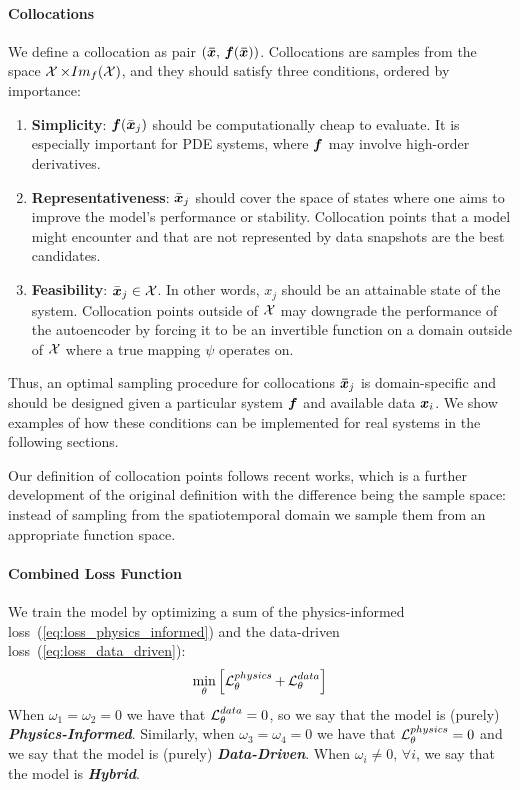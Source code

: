 \paragraph{Collocations}
\label{sec:collocations_conditions} We define a collocation as pair $(\boldsymbol{\bar{x}},\, \boldsymbol{f}(\boldsymbol{\bar{x}}))$. Collocations are samples from the space $\operatorname{\mathcal{X}} \times Im_{f}(\operatorname{\mathcal{X}})$, and they should satisfy three conditions, ordered by importance:
\begin{enumerate}
    \item \textbf{Simplicity}: $\boldsymbol{f}(\bar{\boldsymbol{x}}_j)$ should be computationally cheap to evaluate. It is especially important for PDE systems, where $\boldsymbol{f}$ may involve high-order derivatives.
    \item \textbf{Representativeness}: $\bar{\boldsymbol{x}}_j$ should cover the space of states where one aims to improve the model's performance or stability. Collocation points that a model might encounter and that are not represented by data snapshots are the best candidates.
    \item \textbf{Feasibility}: $\bar{\boldsymbol{x}}_j \in \operatorname{\mathcal{X}}$. In other words, $x_j$ should be an attainable state of the system. Collocation points outside of $\operatorname{\mathcal{X}}$ may downgrade the performance of the autoencoder by forcing it to be an invertible function on a domain outside of $\operatorname{\mathcal{X}}$ where a true mapping $\psi$ operates on.
\end{enumerate}
Thus, an optimal sampling procedure for collocations $\boldsymbol{\bar{x}}_j$ is domain-specific and should be designed given a particular system $\boldsymbol{f}$ and available data $\boldsymbol{x}_i$. We show examples of how these conditions can be implemented for real systems in the following sections.

Our definition of collocation points follows recent works\cite{liu2022physics}, which is a further development of the original definition \cite{raissi2018hidden} with the difference being the sample space: instead of sampling from the spatiotemporal domain we sample them from an appropriate function space. 

\paragraph{Combined Loss Function} We train the model by optimizing a sum of the physics-informed loss~(\ref{eq:loss_physics_informed}) and the data-driven loss~(\ref{eq:loss_data_driven}):
\begin{equation}
    \label{eq:loss_combined}
    \min_\theta \left[\operatorname{\mathcal{L}}^{physics}_\theta + \operatorname{\mathcal{L}}^{data}_\theta\right]  
\end{equation}
When $\omega_1 = \omega_2 = 0$ we have that $\operatorname{\mathcal{L}}^{data}_\theta = 0$, so we say that the model is (purely) \textit{\textbf{Physics-Informed}}. Similarly, when $\omega_3 = \omega_4 = 0$ we have that $\operatorname{\mathcal{L}}^{physics}_\theta = 0$ and we say that the model is (purely) \textit{\textbf{Data-Driven}}. When $\omega_i \neq 0, \, \forall i$, we say that the model is \textit{\textbf{Hybrid}}.

